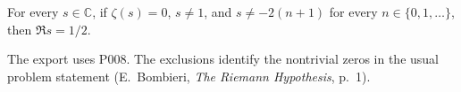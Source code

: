 
\begin{formalstatement}\label{pn:P001}
For every $s\in\mathbb C$, if $\zeta(s)=0$, $s\ne1$, and $s\ne-2(n+1)$ for every $n\in\{0,1,\ldots\}$, then $\Re s=1/2$.
\end{formalstatement}
The export uses P008. The exclusions identify the nontrivial zeros in the usual problem statement (E.~Bombieri, \emph{The Riemann Hypothesis}, p.~1).

